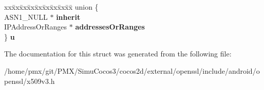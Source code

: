 \begin{DoxyCompactItemize}
\begin{tabbing}
\end{tabbing}\item 
\mbox{\label{structIPAddressChoice__st_a1dabd74a0afaf5a660d8c5af35f370db}} 
\begin{tabbing}
xx\=xx\=xx\=xx\=xx\=xx\=xx\=xx\=xx\=\kill
union \{\\
\>ASN1\_NULL $\ast$ {\bfseries inherit}\\
\>IPAddressOrRanges $\ast$ {\bfseries addressesOrRanges}\\
\} {\bfseries u}\\

\end{tabbing}\end{DoxyCompactItemize}


The documentation for this struct was generated from the following file\+:\begin{DoxyCompactItemize}
\item 
/home/pmx/git/\+P\+M\+X/\+Simu\+Cocos3/cocos2d/external/openssl/include/android/openssl/x509v3.\+h\end{DoxyCompactItemize}
